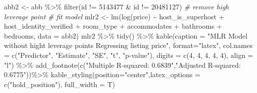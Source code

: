 \documentclass[
]{article}
\newenvironment{Shaded}{\begin{snugshade}}{\end{snugshade}}
\newcommand{\AttributeTok}[1]{\textcolor[rgb]{0.77,0.63,0.00}{#1}}
\newcommand{\CommentTok}[1]{\textcolor[rgb]{0.56,0.35,0.01}{\textit{#1}}}
\newcommand{\DecValTok}[1]{\textcolor[rgb]{0.00,0.00,0.81}{#1}}
\newcommand{\FunctionTok}[1]{\textcolor[rgb]{0.00,0.00,0.00}{#1}}
\newcommand{\NormalTok}[1]{#1}
\newcommand{\OtherTok}[1]{\textcolor[rgb]{0.56,0.35,0.01}{#1}}
\newcommand{\SpecialCharTok}[1]{\textcolor[rgb]{0.00,0.00,0.00}{#1}}
\newcommand{\StringTok}[1]{\textcolor[rgb]{0.31,0.60,0.02}{#1}}
\begin{document}
\begin{Shaded}
\begin{Highlighting}[]
\NormalTok{abb2 }\OtherTok{\textless{}{-}}\NormalTok{ abb }\SpecialCharTok{\%\textgreater{}\%} \FunctionTok{filter}\NormalTok{(id }\SpecialCharTok{!=} \DecValTok{5143477} \SpecialCharTok{\&}\NormalTok{ id }\SpecialCharTok{!=} \DecValTok{20481127}\NormalTok{)  }\CommentTok{\# remove high leverage point}
\CommentTok{\# fit model}
\NormalTok{mlr2 }\OtherTok{\textless{}{-}} \FunctionTok{lm}\NormalTok{(}\FunctionTok{log}\NormalTok{(price) }\SpecialCharTok{\textasciitilde{}}\NormalTok{ host\_is\_superhost }\SpecialCharTok{+}\NormalTok{ host\_identity\_verified }\SpecialCharTok{+}\NormalTok{ room\_type }\SpecialCharTok{+}\NormalTok{ accommodates }\SpecialCharTok{+}\NormalTok{ bathrooms }\SpecialCharTok{+}\NormalTok{ bedrooms, }\AttributeTok{data =}\NormalTok{ abb2)}
\NormalTok{mlr2 }\SpecialCharTok{\%\textgreater{}\%}
  \FunctionTok{tidy}\NormalTok{() }\SpecialCharTok{\%\textgreater{}\%} 
  \FunctionTok{kable}\NormalTok{(}\AttributeTok{caption =} \StringTok{"MLR Model without hight leverage points Regressing listing price"}\NormalTok{,}
        \AttributeTok{format=}\StringTok{"latex"}\NormalTok{,}
        \AttributeTok{col.names =} \FunctionTok{c}\NormalTok{(}\StringTok{"Predictor"}\NormalTok{, }\StringTok{"Estimate"}\NormalTok{, }\StringTok{"SE"}\NormalTok{, }\StringTok{"t"}\NormalTok{, }\StringTok{"p{-}value"}\NormalTok{),}
        \AttributeTok{digits =} \FunctionTok{c}\NormalTok{(}\DecValTok{4}\NormalTok{, }\DecValTok{4}\NormalTok{, }\DecValTok{4}\NormalTok{, }\DecValTok{4}\NormalTok{, }\DecValTok{4}\NormalTok{),}
        \AttributeTok{align =} \StringTok{"l"}\NormalTok{) }\SpecialCharTok{\%\textgreater{}\%} 
  \FunctionTok{add\_footnote}\NormalTok{(}\FunctionTok{c}\NormalTok{(}\StringTok{"Multiple R{-}squared: 0.6839"}\NormalTok{,}\StringTok{"Adjusted R{-}squared: 0.6775"}\NormalTok{))}\SpecialCharTok{\%\textgreater{}\%} 
  \FunctionTok{kable\_styling}\NormalTok{(}\AttributeTok{position=}\StringTok{"center"}\NormalTok{,}\AttributeTok{latex\_options =} \FunctionTok{c}\NormalTok{(}\StringTok{"hold\_position"}\NormalTok{), }\AttributeTok{full\_width =}\NormalTok{ T)}
\end{Highlighting}
\end{Shaded}
\end{document}
